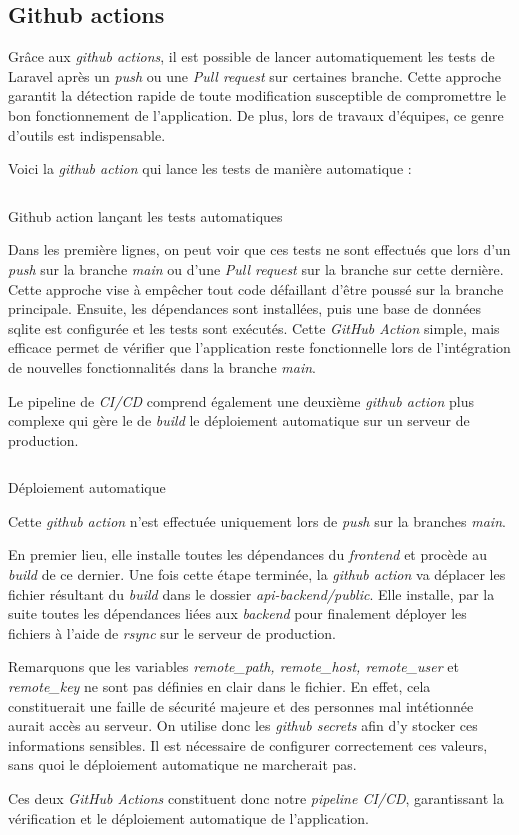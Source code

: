 \subsection{Github actions}
Grâce aux \emph{github actions}, il est possible de lancer automatiquement les tests de Laravel après un \emph{push} ou une \emph{Pull request} sur certaines branche. Cette approche garantit la détection rapide de toute modification susceptible de compromettre le bon fonctionnement de l'application. De plus, lors de travaux d'équipes, ce genre d'outils est indispensable.

Voici la \emph{github action} qui lance les tests de manière automatique :

\begin{listing}[H]
    \inputminted{yaml}{assets/code/laravelCI.yaml}
    \caption{Github action lançant les tests automatiques}
\end{listing}

Dans les première lignes, on peut voir que ces tests ne sont effectués que lors d'un \emph{push} sur la branche \emph{main} ou d'une \emph{Pull request} sur la branche sur cette dernière. Cette approche vise à empêcher tout code défaillant d'être poussé sur la branche principale. Ensuite, les dépendances sont installées, puis une base de données sqlite est configurée et les tests sont exécutés.
Cette \emph{GitHub Action} simple, mais efficace permet de vérifier que l'application reste fonctionnelle lors de l'intégration de nouvelles fonctionnalités dans la branche \emph{main}.

Le pipeline de \emph{CI/CD} comprend également une deuxième \emph{github action} plus complexe qui gère le de \emph{build} le déploiement automatique sur un serveur de production.

\begin{listing}[H]
    \inputminted{yaml}{assets/code/deployCD.yaml}
    \caption{Déploiement automatique}
\end{listing}

Cette \emph{github action} n'est effectuée uniquement lors de \emph{push} sur la branches \emph{main}.

En premier lieu, elle installe toutes les dépendances du \emph{frontend} et procède au \emph{build} de ce dernier. Une fois cette étape terminée, la \emph{github action} va déplacer les fichier résultant du \emph{build} dans le dossier \emph{api-backend/public}.
Elle installe, par la suite toutes les dépendances liées aux \emph{backend} pour finalement déployer les fichiers à l'aide de \emph{rsync} sur le serveur de production.

Remarquons que les variables \emph{remote\_path, remote\_host, remote\_user} et \emph{remote\_key} ne sont pas définies en clair dans le fichier. En effet, cela constituerait une faille de sécurité majeure et des personnes mal intétionnée aurait accès au serveur.
On utilise donc les \emph{github secrets} afin d'y stocker ces informations sensibles. Il est nécessaire de configurer correctement ces valeurs, sans quoi le déploiement automatique ne marcherait pas.

Ces deux \emph{GitHub Actions} constituent donc notre \emph{pipeline CI/CD}, garantissant la vérification et le déploiement automatique de l'application.